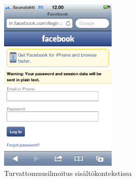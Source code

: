 \documentclass[finnish,gradu]{tktltiki}
\begin{document}
  \begin{figure}
    \centering
    \includegraphics[width=0.5\textwidth]{images/trust_context_html_unsecure.png}
    \caption{Turvattomuusilmoitus sisältökontekstissa}
    \label{fig:trust_context_html_unsecure}
  \end{figure}



\end{document}
